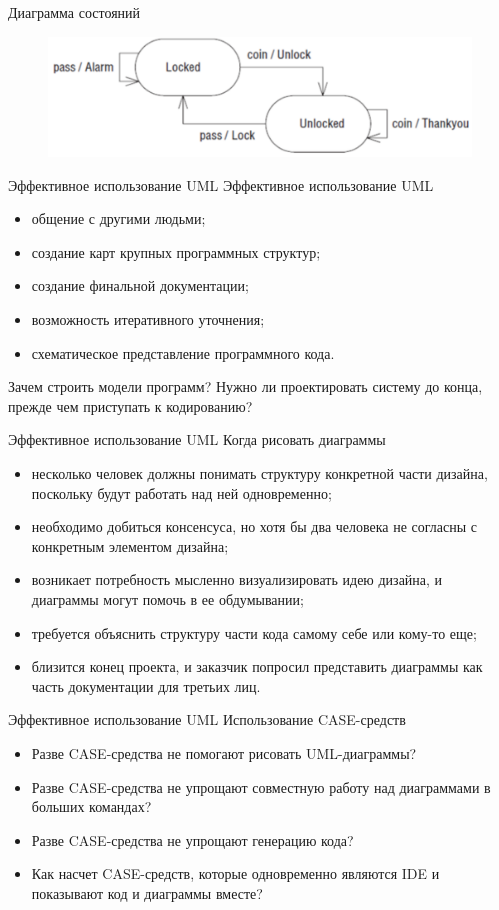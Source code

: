 \documentclass{beamer}
\begin{document}
\begin{frame}[t]{Диаграмма состояний}
\begin{figure}[h]
\centering
\includegraphics[scale=0.45]{images/lec03-pic30.png}
\end{figure}
\end{frame}

\begin{frame}[t]{Эффективное использование UML}
Эффективное использование UML
\begin{itemize}
\item общение с другими людьми;
\item создание карт крупных программных структур;
\item создание финальной документации;
\item возможность итеративного уточнения;
\item схематическое представление программного кода.
\end{itemize}
Зачем строить модели программ? Нужно ли проектировать систему до конца,
прежде чем приступать к кодированию?
\end{frame}

\begin{frame}[t]{Эффективное использование UML}
Когда рисовать диаграммы
\begin{itemize}
\item несколько человек должны понимать структуру конкретной части дизайна, поскольку будут работать над ней одновременно;
\item необходимо добиться консенсуса, но хотя бы два человека не согласны с конкретным элементом дизайна;
\item возникает потребность мысленно визуализировать идею дизайна, и диаграммы могут помочь в ее обдумывании;
\item требуется объяснить структуру части кода самому себе или кому-то еще;
\item близится конец проекта, и заказчик попросил представить диаграммы как часть документации для третьих лиц.
\end{itemize}
\end{frame}

\begin{frame}[t]{Эффективное использование UML}
Использование CASE-средств
\begin{itemize}
\item Разве CASE-средства не помогают рисовать UML-диаграммы?
\item Разве CASE-средства не упрощают совместную работу над диаграммами в больших командах?
\item Разве CASE-средства не упрощают генерацию кода?
\item Как насчет CASE-средств, которые одновременно являются IDE и показывают код и диаграммы вместе?
\end{itemize}
\end{frame}
\end{document}
